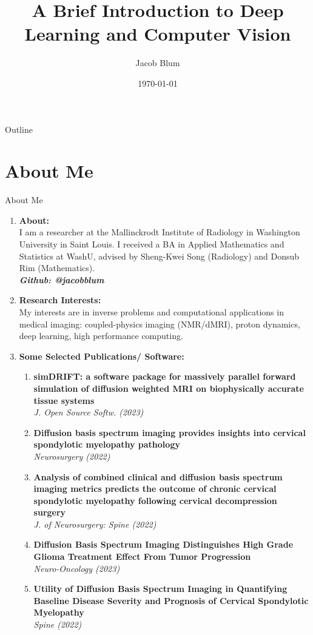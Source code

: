 \documentclass{beamer}
\title{A Brief Introduction to Deep Learning and Computer Vision}
\author{Jacob Blum}
\institute{Department of Radiology, Washington University in St. Louis School of Medicine}
\date{\today}
\begin{document}
\begin{frame}[plain]
    \titlepage
  \end{frame}

  
\begin{frame}[plain]{Outline}
  \tableofcontents
\end{frame}


\section{About Me}
\begin{frame}[plain]{About Me}


    \begin{enumerate}
        \item \textbf{About:} \mbox{}\\ I am a researcher at the Mallinckrodt Institute of Radiology in Washington University in Saint Louis. I received a BA in Applied Mathematics and Statistics at WashU, advised by Sheng-Kwei Song (Radiology) and Donsub Rim (Mathematics).  \mbox{}\\ \textbf{\textit{Github: @jacobblum}}
        \item \textbf{Research Interests:} \mbox{}\\ My interests are in inverse problems and computational applications in medical imaging: coupled-physics imaging (NMR/dMRI), proton dynamics, deep learning, high performance computing.
        \item \textbf{Some Selected Publications/ Software:} 
        
        \begin{enumerate}
            \item \textbf{simDRIFT: a software package for massively parallel forward simulation of diffusion weighted MRI on biophysically accurate tissue systems} \mbox{}\\ \textit{J. Open Source Softw. (2023)}
            \item \textbf{Diffusion basis spectrum imaging provides insights into cervical spondylotic myelopathy pathology} \mbox{}\\ \textit{Neurosurgery (2022)}
            \item \textbf{Analysis of combined clinical and diffusion basis spectrum imaging metrics predicts the outcome of chronic cervical spondylotic myelopathy following cervical decompression surgery} \mbox{}\\ \textit{J. of Neurosurgery: Spine (2022)}
            \item \textbf{Diffusion Basis Spectrum Imaging Distinguishes High Grade Glioma Treatment Effect From Tumor Progression} \mbox{}\\ \textit{Neuro-Oncology (2023)}
            \item \textbf{Utility of Diffusion Basis Spectrum Imaging in Quantifying Baseline Disease Severity and Prognosis of Cervical Spondylotic Myelopathy} \mbox{}\\ \textit{Spine (2022)}
        

\end{enumerate}
\end{enumerate}
\end{frame}
\end{document}
